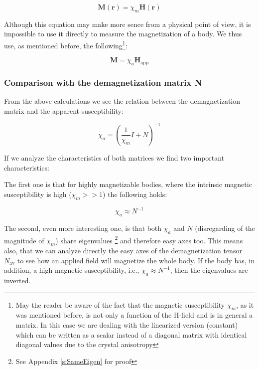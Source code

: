 \begin{equation}
 \textbf{M}(\textbf{r}) = \chi_m\textbf{H}(\textbf{r})
\end{equation}

Although this equation may make more sence from a physical point of view, it is impossible to use it directly to measure the magnetization of a body. We thus use, as mentioned before, the following\footnote{May the reader be aware of the fact that the magnetic susceptibility $\chi_m$, as it was mentioned before, is not only a function of the H-field and is in general a matrix. In this case we are dealing with the linearized version (constant) which can be written as a scalar instead of a diagonal matrix with identical diagonal values due to the crystal anisotropy}:

\begin{equation}
 \textbf{M} = \chi_a\textbf{H}_\text{app}
\end{equation}

\subsubsection{Comparison with the demagnetization matrix N}

From the above calculations we see the relation between the demagnetization matrix and the apparent susceptibility:

\begin{equation}\label{eq:chia}
\chi_a = \left(\frac{1}{\chi_m}I+N\right)^{-1}
\end{equation}

If we analyze the characteristics of both matrices we find two important characteristics:

The first one is that for highly magnetizable bodies, where the intrinsic magnetic susceptibility is high ($\chi_m >>1$) the following holds:

\begin{equation}
\chi_a \approx  N^{-1}
\end{equation}

The second, even more interesting one, is that both $\chi_a$ and $N$ (disregarding of the magnitude of $\chi_m$) share eigenvalues \footnote{See Appendix \ref{s:SameEigen} for proof} and therefore easy axes too. This means also, that we can analyze directly the easy axes of the demagnetization tensor $N_\text{av}$ to see how an applied field will magnetize the whole body. If the body has, in addition, a high magnetic susceptibility, i.e., $\chi_a \approx  N^{-1}$, then the eigenvalues are inverted.\\

